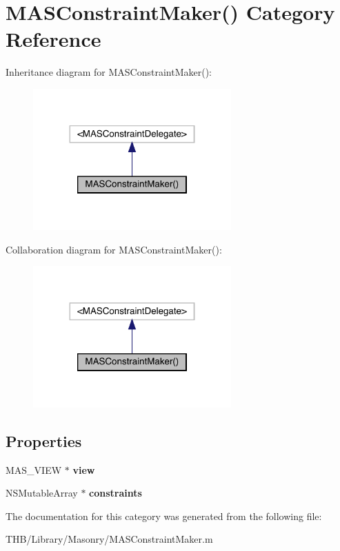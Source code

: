 \hypertarget{category_m_a_s_constraint_maker_07_08}{}\section{M\+A\+S\+Constraint\+Maker() Category Reference}
\label{category_m_a_s_constraint_maker_07_08}


Inheritance diagram for M\+A\+S\+Constraint\+Maker()\+:\nopagebreak
\begin{figure}[H]
\begin{center}
\leavevmode
\includegraphics[width=215pt]{category_m_a_s_constraint_maker_07_08__inherit__graph}
\end{center}
\end{figure}


Collaboration diagram for M\+A\+S\+Constraint\+Maker()\+:\nopagebreak
\begin{figure}[H]
\begin{center}
\leavevmode
\includegraphics[width=215pt]{category_m_a_s_constraint_maker_07_08__coll__graph}
\end{center}
\end{figure}
\subsection*{Properties}
\begin{DoxyCompactItemize}
\item 
\mbox{\label{category_m_a_s_constraint_maker_07_08_ade90b491e46d22e544b2f6701ef2f97c}} 
M\+A\+S\+\_\+\+V\+I\+EW $\ast$ {\bfseries view}
\item 
\mbox{\label{category_m_a_s_constraint_maker_07_08_adc7376e4e73b30ef85786c6cde3af2f3}} 
N\+S\+Mutable\+Array $\ast$ {\bfseries constraints}
\end{DoxyCompactItemize}


The documentation for this category was generated from the following file\+:\begin{DoxyCompactItemize}
\item 
T\+H\+B/\+Library/\+Masonry/M\+A\+S\+Constraint\+Maker.\+m\end{DoxyCompactItemize}
